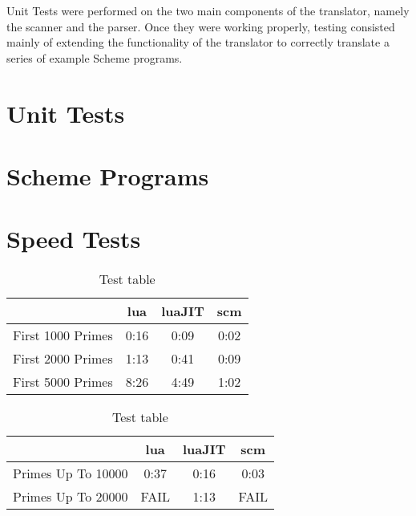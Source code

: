 Unit Tests were performed on the two main components of the translator, namely
the scanner and the parser. Once they were working properly, testing consisted
mainly of extending the functionality of the translator to correctly translate a
series of example Scheme programs.

\section{Unit Tests}


\section{Scheme Programs}


\section{Speed Tests}

\begin{table}
\centering
\begin{tabular}{|l|c|c|c|}
\hline
& lua & luaJIT & scm \\
\hline
First 1000 Primes & 0:16 & 0:09 & 0:02 \\ \hline
First 2000 Primes & 1:13 & 0:41 & 0:09 \\ \hline
First 5000 Primes & 8:26 & 4:49 & 1:02 \\ \hline
\end{tabular}
\caption{Test table}
\end{table}

\begin{table}
\centering
\begin{tabular}{|l|c|c|c|}
\hline
& lua & luaJIT & scm \\
\hline
Primes Up To 10000 & 0:37 & 0:16 & 0:03 \\ \hline
Primes Up To 20000 & FAIL & 1:13 & FAIL \\ \hline
\end{tabular}
\caption{Test table}
\end{table}
